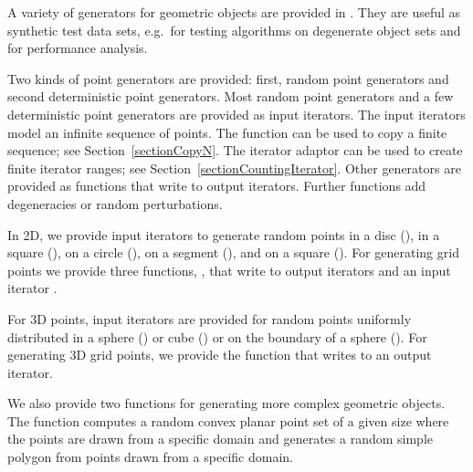 



A variety of generators for geometric objects are provided in \cgal.
They are useful as synthetic test data sets, e.g.~for testing
algorithms on degenerate object sets and for performance analysis.

Two kinds of point generators are provided: first, random point
generators and second deterministic point generators. Most random
point generators and a few deterministic point generators are provided
as input iterators.  The input iterators model an infinite sequence of
points. The function  can be used to copy a
finite sequence; see Section~\ref{sectionCopyN}. The iterator adaptor
 can be used to create finite iterator
ranges; see Section~\ref{sectionCountingIterator}.
Other generators are provided as functions that write to output
iterators. Further functions add degeneracies or random perturbations.

In 2D, we provide input iterators to generate random points in a disc
(), 
in a square (),
on a circle (), 
on a segment (),
and on a square ().
For generating grid points we provide three functions,
,
 that write to output iterators and
an input iterator .

For 3D points, input iterators are provided for random points uniformly 
distributed in a sphere ()
or cube () or on the boundary of a sphere
().
For generating 3D grid points, we provide the function 
 that writes to
an output iterator.

We also provide two functions for generating more complex geometric objects.
The function  computes a random convex planar
point set of a given size where the points are drawn from a specific
domain and  generates a random simple polygon from
points drawn from a specific domain.  

